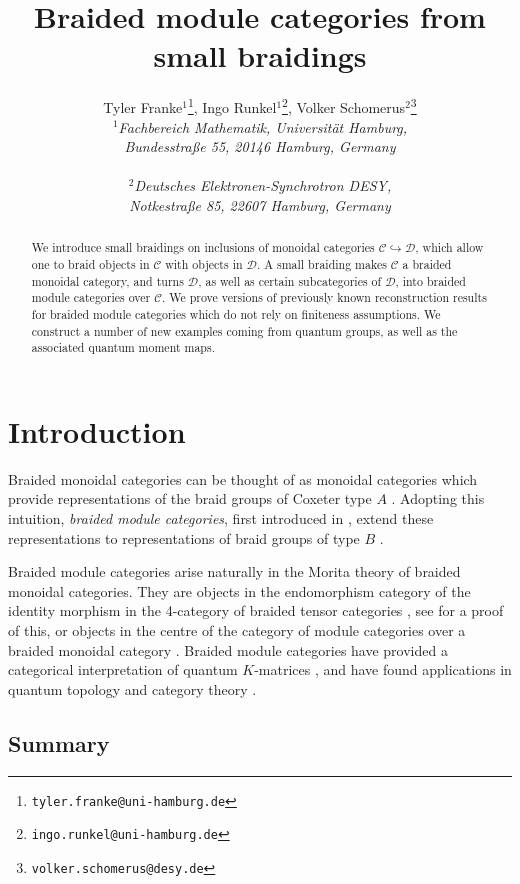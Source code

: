 \documentclass[12pt,dvipsnames]{article}
\title{Braided module categories from small braidings}
\author{Tyler Franke$^1$\footnote{\texttt{tyler.franke@uni-hamburg.de}}, Ingo Runkel$^1$\footnote{\texttt{ingo.runkel@uni-hamburg.de}}, Volker Schomerus$^2$\footnote{\texttt{volker.schomerus@desy.de}}\\[.5cm]
$^1$\normalsize\slshape Fachbereich Mathematik, Universit\"{a}t Hamburg,\\
\normalsize\slshape Bundesstra{\ss}e 55, 20146 Hamburg, Germany \\ \\
$^2$\normalsize\slshape Deutsches Elektronen-Synchrotron DESY,\\
\normalsize\slshape Notkestra{\ss}e 85, 22607 Hamburg, Germany
}
\date{}
\numberwithin{equation}{section}
\theoremstyle{definition}
\newcommand{\cat}[1]{\mathcal{#1}}
\newcommand{\1}{\ensuremath{\mathbbm{1}}}
\begin{document}
\maketitle

\begin{abstract}
We introduce small braidings on inclusions of monoidal categories $\cat{C}\hookrightarrow\cat{D}$, which allow one to braid objects in $\cat{C}$ with objects in $\cat{D}$. 
A small braiding makes $\cat{C}$ a braided monoidal category, and turns $\cat{D}$, as well as certain subcategories of $\cat{D}$, into braided module categories over $\cat{C}$. 
We prove versions of previously known reconstruction results for braided module categories which do not rely on finiteness assumptions. 
We construct a number of new examples coming from quantum groups, as well as the associated quantum moment maps.
\end{abstract}

\newpage

\tableofcontents

\section{Introduction}

Braided monoidal categories can be thought of as monoidal categories which provide representations of the braid groups of Coxeter type $A$ \cite{JS93}. Adopting this intuition, \emph{braided module categories}, first introduced in \cite{En04}, extend these representations to representations of braid groups of type $B$ \cite{Br12}.

Braided module categories arise naturally in the Morita theory of braided monoidal categories. They are objects in the endomorphism category of the identity morphism in the 4-category of braided tensor categories
\cite{BJS18}, see \cite[Sec.\,3.3]{Jo23} for a proof of this, or objects in the centre of the category of module categories over a braided monoidal category \cite[Thm.\,4.11]{DN20}. Braided module categories have provided a categorical interpretation of quantum $K$-matrices \cite{Ko17,LWY23}, and have found applications in quantum topology \cite{BBJ16} and category theory \cite{JR21}.

\subsection{Summary}
\end{document}
